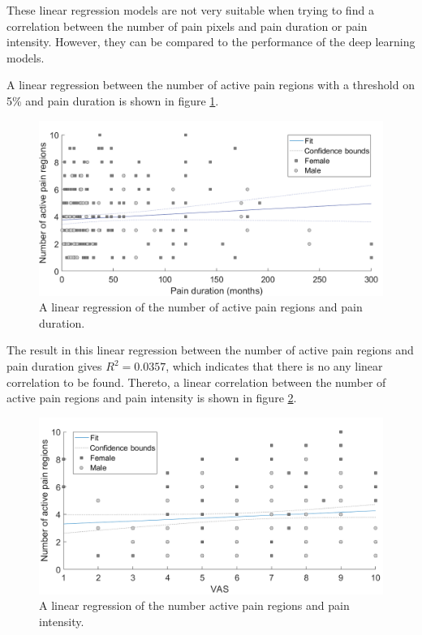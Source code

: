 \noindent
These linear regression models are not very suitable when trying to find a correlation between the number of pain pixels and pain duration or pain intensity. However, they can be compared to the performance of the deep learning models.


\noindent
A linear regression between the number of active pain regions with a threshold on 5\% and pain duration is shown in figure \ref{fig:regDuration}. \newline

\begin{figure} [H]
\centering
\includegraphics[width=1\textwidth]{figures/duraregion}
\caption{A linear regression of the number of active pain regions and pain duration.}
\label{fig:regDuration}
\end{figure}

\noindent
The result in this linear regression between the number of active pain regions and pain duration gives $R^2=0.0357$, which indicates that there is no any linear correlation to be found.\newline
Thereto, a linear correlation between the number of active pain regions and pain intensity is shown in figure \ref{fig:regPain}.

\begin{figure} [H]
\centering
\includegraphics[width=1\textwidth]{figures/vasregion}
\caption{A linear regression of the number active pain regions and pain intensity.}
\label{fig:regPain}
\end{figure}

